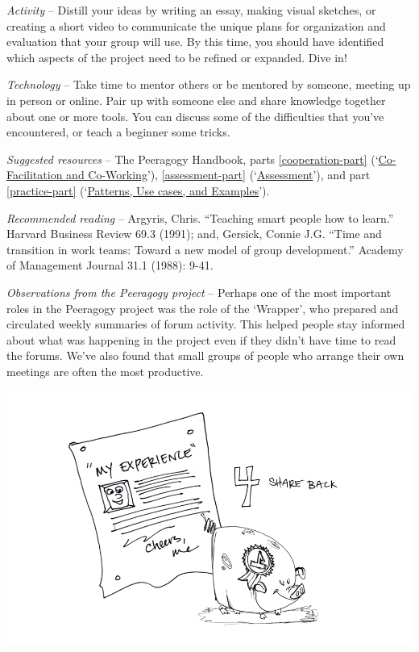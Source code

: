 \emph{Activity} -- Distill your ideas by writing an essay, making visual
sketches, or creating a short video to communicate the unique plans for
organization and evaluation that your group will use. By this time, you
should have identified which aspects of the project need to be refined
or expanded. Dive in!

\medskip

\emph{Technology} -- Take time to mentor others or be mentored by
someone, meeting up in person or online. Pair up with someone else and
share knowledge together about one or more tools. You can discuss some
of the difficulties that you've encountered, or teach a beginner some
tricks.

\medskip

\emph{Suggested resources} -- The Peeragogy Handbook, parts \ref{cooperation-part}
(`\href{http://peeragogy.org/co-facilitation/}{Co-Facilitation and
Co-Working}'), \ref{assessment-part}
(`\href{http://peeragogy.org/assessment/}{Assessment}'), and part \ref{practice-part}
(`\href{http://peeragogy.org/patterns-usecases/}{Patterns, Use cases,
and Examples}').

\medskip

\emph{Recommended reading} -- Argyris, Chris. ``Teaching smart people
how to learn.'' Harvard Business Review 69.3 (1991); and, Gersick,
Connie J.G. ``Time and transition in work teams: Toward a new model of
group development.'' Academy of Management Journal 31.1 (1988): 9-41.

\medskip

\emph{Observations from the Peeragogy project} -- Perhaps one of the
most important roles in the Peeragogy project was the role of the
`Wrapper', who prepared and circulated weekly summaries of forum
activity. This helped people stay informed about what was happening in
the project even if they didn't have time to read the forums. We've also
found that small groups of people who arrange their own meetings are
often the most productive.

\begin{center}
\includegraphics{../pictures/OpenBook-2-4.jpg}
\end{center}

